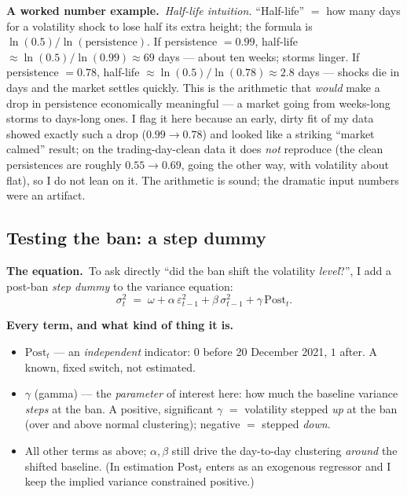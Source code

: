 \documentclass[11pt]{article}
\newcommand{\example}{\smallskip\noindent\textbf{A worked number example.}\ }
\newcommand{\formula}{\smallskip\noindent\textbf{The equation.}\ }
\newcommand{\vars}{\smallskip\noindent\textbf{Every term, and what kind of thing it is.}\ }
\begin{document}
\example \emph{Half-life intuition.} ``Half-life'' $=$ how many days for a volatility shock to lose
half its extra height; the formula is $\ln(0.5)/\ln(\text{persistence})$. If persistence $=0.99$,
half-life $\approx \ln(0.5)/\ln(0.99) \approx 69$ days --- about ten weeks; storms linger. If
persistence $=0.78$, half-life $\approx \ln(0.5)/\ln(0.78) \approx 2.8$ days --- shocks die in days
and the market settles quickly. This is the arithmetic that \emph{would} make a drop in persistence
economically meaningful --- a market going from weeks-long storms to days-long ones. I flag it here
because an early, dirty fit of my data showed exactly such a drop ($0.99 \to 0.78$) and looked like a
striking ``market calmed'' result; on the trading-day-clean data it does \emph{not} reproduce (the
clean persistences are roughly $0.55 \to 0.69$, going the other way, with volatility about flat), so
I do not lean on it. The arithmetic is sound; the dramatic input numbers were an artifact.

\subsection{Testing the ban: a step dummy}

\formula To ask directly ``did the ban shift the volatility \emph{level}?'', I add a post-ban
\emph{step dummy} to the variance equation:
\[
\sigma_t^2 \;=\; \omega + \alpha\,\varepsilon_{t-1}^2 + \beta\,\sigma_{t-1}^2 + \gamma\,\mathrm{Post}_t.
\]

\vars
\begin{itemize}
\item $\mathrm{Post}_t$ --- an \emph{independent} indicator: $0$ before 20 December 2021, $1$ after.
A known, fixed switch, not estimated.
\item $\gamma$ (gamma) --- the \emph{parameter} of interest here: how much the baseline variance
\emph{steps} at the ban. A positive, significant $\gamma$ $=$ volatility stepped \emph{up} at the
ban (over and above normal clustering); negative $=$ stepped \emph{down}.
\item All other terms as above; $\alpha,\beta$ still drive the day-to-day clustering \emph{around}
the shifted baseline. (In estimation $\mathrm{Post}_t$ enters as an exogenous regressor and I keep
the implied variance constrained positive.)
\end{itemize}
\end{document}

